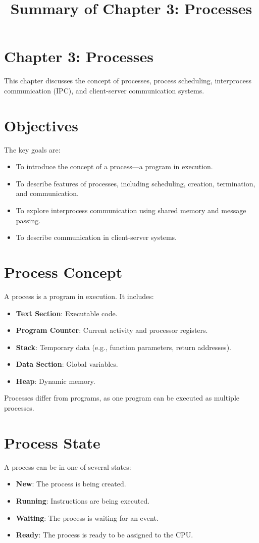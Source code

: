 \documentclass{article}
\title{Summary of Chapter 3: Processes}
\author{}
\date{}
\begin{document}
\maketitle

\section{Chapter 3: Processes}
This chapter discusses the concept of processes, process scheduling, interprocess communication (IPC), and client-server communication systems.

\section{Objectives}
The key goals are:
\begin{itemize}
    \item To introduce the concept of a process—a program in execution.
    \item To describe features of processes, including scheduling, creation, termination, and communication.
    \item To explore interprocess communication using shared memory and message passing.
    \item To describe communication in client-server systems.
\end{itemize}

\section{Process Concept}
A process is a program in execution. It includes:
\begin{itemize}
    \item \textbf{Text Section}: Executable code.
    \item \textbf{Program Counter}: Current activity and processor registers.
    \item \textbf{Stack}: Temporary data (e.g., function parameters, return addresses).
    \item \textbf{Data Section}: Global variables.
    \item \textbf{Heap}: Dynamic memory.
\end{itemize}

Processes differ from programs, as one program can be executed as multiple processes.

\section{Process State}
A process can be in one of several states:
\begin{itemize}
    \item \textbf{New}: The process is being created.
    \item \textbf{Running}: Instructions are being executed.
    \item \textbf{Waiting}: The process is waiting for an event.
    \item \textbf{Ready}: The process is ready to be assigned to the CPU.
\end{itemize}
\end{document}
